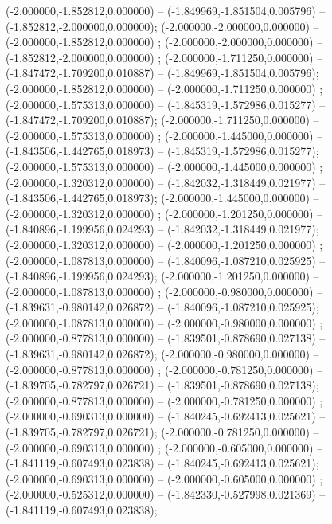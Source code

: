  (-2.000000,-1.852812,0.000000) -- (-1.849969,-1.851504,0.005796) -- (-1.852812,-2.000000,0.000000);
 (-2.000000,-2.000000,0.000000) -- (-2.000000,-1.852812,0.000000) ;
 (-2.000000,-2.000000,0.000000) -- (-1.852812,-2.000000,0.000000) ;
 (-2.000000,-1.711250,0.000000) -- (-1.847472,-1.709200,0.010887) -- (-1.849969,-1.851504,0.005796);
 (-2.000000,-1.852812,0.000000) -- (-2.000000,-1.711250,0.000000) ;
 (-2.000000,-1.575313,0.000000) -- (-1.845319,-1.572986,0.015277) -- (-1.847472,-1.709200,0.010887);
 (-2.000000,-1.711250,0.000000) -- (-2.000000,-1.575313,0.000000) ;
 (-2.000000,-1.445000,0.000000) -- (-1.843506,-1.442765,0.018973) -- (-1.845319,-1.572986,0.015277);
 (-2.000000,-1.575313,0.000000) -- (-2.000000,-1.445000,0.000000) ;
 (-2.000000,-1.320312,0.000000) -- (-1.842032,-1.318449,0.021977) -- (-1.843506,-1.442765,0.018973);
 (-2.000000,-1.445000,0.000000) -- (-2.000000,-1.320312,0.000000) ;
 (-2.000000,-1.201250,0.000000) -- (-1.840896,-1.199956,0.024293) -- (-1.842032,-1.318449,0.021977);
 (-2.000000,-1.320312,0.000000) -- (-2.000000,-1.201250,0.000000) ;
 (-2.000000,-1.087813,0.000000) -- (-1.840096,-1.087210,0.025925) -- (-1.840896,-1.199956,0.024293);
 (-2.000000,-1.201250,0.000000) -- (-2.000000,-1.087813,0.000000) ;
 (-2.000000,-0.980000,0.000000) -- (-1.839631,-0.980142,0.026872) -- (-1.840096,-1.087210,0.025925);
 (-2.000000,-1.087813,0.000000) -- (-2.000000,-0.980000,0.000000) ;
 (-2.000000,-0.877813,0.000000) -- (-1.839501,-0.878690,0.027138) -- (-1.839631,-0.980142,0.026872);
 (-2.000000,-0.980000,0.000000) -- (-2.000000,-0.877813,0.000000) ;
 (-2.000000,-0.781250,0.000000) -- (-1.839705,-0.782797,0.026721) -- (-1.839501,-0.878690,0.027138);
 (-2.000000,-0.877813,0.000000) -- (-2.000000,-0.781250,0.000000) ;
 (-2.000000,-0.690313,0.000000) -- (-1.840245,-0.692413,0.025621) -- (-1.839705,-0.782797,0.026721);
 (-2.000000,-0.781250,0.000000) -- (-2.000000,-0.690313,0.000000) ;
 (-2.000000,-0.605000,0.000000) -- (-1.841119,-0.607493,0.023838) -- (-1.840245,-0.692413,0.025621);
 (-2.000000,-0.690313,0.000000) -- (-2.000000,-0.605000,0.000000) ;
 (-2.000000,-0.525312,0.000000) -- (-1.842330,-0.527998,0.021369) -- (-1.841119,-0.607493,0.023838);
